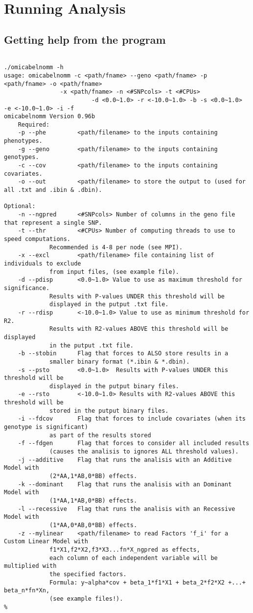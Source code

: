 \documentclass{report}
\begin{document}
\chapter{Running Analysis}

\section{Getting help from the program}

\begin{lstlisting}[style=BASH,escapechar=\%]

./omicabelnomm -h
usage: omicabelnomm -c <path/fname> --geno <path/fname> -p <path/fname> -o <path/fname> 
                -x <path/fname> -n <#SNPcols> -t <#CPUs>
                         -d <0.0~1.0> -r <-10.0~1.0> -b -s <0.0~1.0>  -e <-10.0~1.0> -i -f
omicabelnomm Version 0.96b 
	Required: 
	-p --phe    	 <path/filename> to the inputs containing phenotypes. 
	-g --geno   	 <path/filename> to the inputs containing genotypes. 
	-c --cov    	 <path/filename> to the inputs containing covariates. 
	-o --out    	 <path/filename> to store the output to (used for all .txt and .ibin & .dbin). 

Optional: 
	-n --ngpred 	 <#SNPcols> Number of columns in the geno file that represent a single SNP. 
	-t --thr    	 <#CPUs> Number of computing threads to use to speed computations.
			 Recommended is 4-8 per node (see MPI). 
	-x --excl   	 <path/filename> file containing list of individuals to exclude 
			 from input files, (see example file). 
	-d --pdisp  	 <0.0~1.0> Value to use as maximum threshold for significance.
			 Results with P-values UNDER this threshold will be 
			 displayed in the putput .txt file. 
	-r --rdisp  	 <-10.0~1.0> Value to use as minimum threshold for R2. 
			 Results with R2-values ABOVE this threshold will be displayed
			 in the putput .txt file. 
	-b --stobin 	 Flag that forces to ALSO store results in a
			 smaller binary format (*.ibin & *.dbin). 
	-s --psto   	 <0.0~1.0>  Results with P-values UNDER this threshold will be 
			 displayed in the putput binary files. 
	-e --rsto   	 <-10.0~1.0> Results with R2-values ABOVE this threshold will be 
			 stored in the putput binary files. 
	-i --fdcov  	 Flag that forces to include covariates (when its genotype is significant) 
			 as part of the results stored 
	-f --fdgen  	 Flag that forces to consider all included results 
			 (causes the analisis to ignores ALL threshold values). 
	-j --additive  	 Flag that runs the analisis with an Additive Model with 
			 (2*AA,1*AB,0*BB) effects. 
	-k --dominant  	 Flag that runs the analisis with an Dominant Model with 
			 (1*AA,1*AB,0*BB) effects. 
	-l --recessive 	 Flag that runs the analisis with an Recessive Model with 
			 (1*AA,0*AB,0*BB) effects. 
	-z --mylinear 	 <path/filename> to read Factors 'f_i' for a Custom Linear Model with
			 f1*X1,f2*X2,f3*X3...fn*X_ngpred as effects,
			 each column of each independent variable will be multiplied with
			 the specified factors. 
			 Formula: y~alpha*cov + beta_1*f1*X1 + beta_2*f2*X2 +...+ beta_n*fn*Xn, 
			 (see example files!). 
%
\end{lstlisting}
\end{document}
